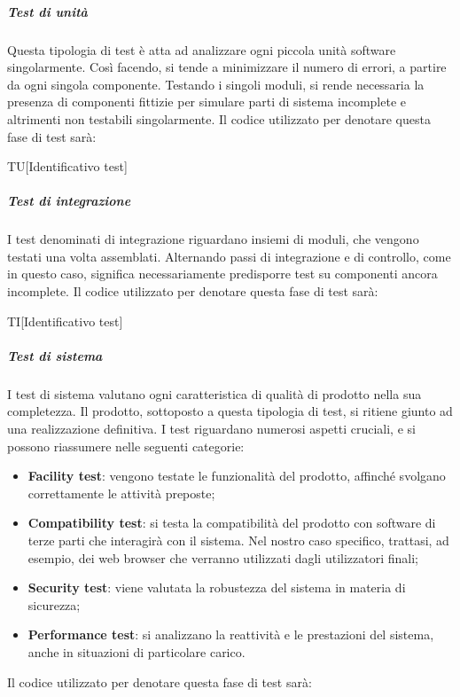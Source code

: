 		\subparagraph{Test di unità}
		Questa tipologia di test è atta ad analizzare ogni piccola unità software singolarmente. Così facendo, si tende a minimizzare il numero di errori, a partire da ogni singola componente. Testando i singoli moduli, si rende necessaria la presenza di componenti fittizie per simulare parti di sistema incomplete e altrimenti non testabili singolarmente. Il codice utilizzato per denotare questa fase di test sarà:
		
		\begin{center}
			TU[Identificativo test]
		\end{center}
	
		\subparagraph{Test di integrazione}
		I test denominati di integrazione riguardano insiemi di moduli, che vengono testati una volta assemblati. Alternando passi di integrazione e di controllo, come in questo caso, significa necessariamente predisporre test su componenti ancora incomplete. Il codice utilizzato per denotare questa fase di test sarà:
		
		\begin{center}
			TI[Identificativo test]
		\end{center}
		
		\subparagraph{Test di sistema}
		I test di sistema valutano ogni caratteristica di qualità di prodotto nella sua completezza. Il prodotto, sottoposto a questa tipologia di test, si ritiene giunto ad una realizzazione definitiva. I test riguardano numerosi aspetti cruciali, e si possono riassumere nelle seguenti categorie:
		
		\begin{itemize}
			\item \textbf{Facility test}: vengono testate le funzionalità del prodotto, affinché svolgano correttamente le attività preposte;
			\item \textbf{Compatibility test}: si testa la compatibilità del prodotto con software di terze parti che interagirà con il sistema. Nel nostro caso specifico, trattasi, ad esempio, dei web browser che verranno utilizzati dagli utilizzatori finali;
			\item \textbf{Security test}: viene valutata la robustezza del sistema in materia di sicurezza;
			\item \textbf{Performance test}: si analizzano la reattività e le prestazioni del sistema, anche in situazioni di particolare carico.
		\end{itemize}
	
		Il codice utilizzato per denotare questa fase di test sarà:
		
